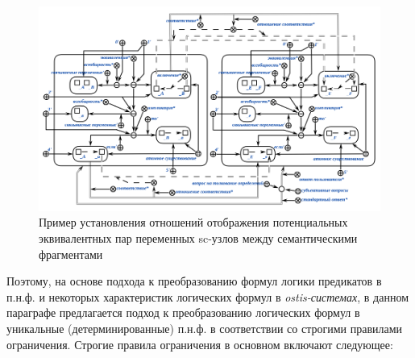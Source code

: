\begin{figure}[H]
	\includegraphics[scale=0.65]{author/part7/figures/establishment_mapping_relationship_example.png}
	\caption{Пример установления отношений отображения потенциальных эквивалентных пар переменных sc-узлов между семантическими фрагментами}
	\label{fig:EMR_example}
\end{figure}

Поэтому, на основе подхода к преобразованию формул логики предикатов в п.н.ф. и некоторых характеристик логических формул в \textit{ostis-системах}, в данном параграфе предлагается подход к преобразованию логических формул в уникальные (детерминированные) п.н.ф. в соответствии со строгими правилами ограничения. Строгие правила ограничения в основном включают следующее:

